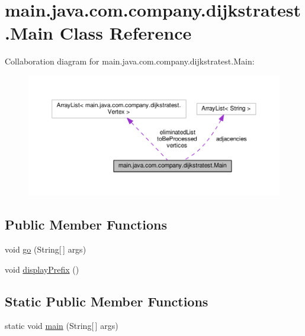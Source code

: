 \hypertarget{classmain_1_1java_1_1com_1_1company_1_1dijkstratest_1_1_main}{\section{main.\-java.\-com.\-company.\-dijkstratest.\-Main Class Reference}
\label{classmain_1_1java_1_1com_1_1company_1_1dijkstratest_1_1_main}
}


Collaboration diagram for main.\-java.\-com.\-company.\-dijkstratest.\-Main\-:
\nopagebreak
\begin{figure}[H]
\begin{center}
\leavevmode
\includegraphics[width=350pt]{classmain_1_1java_1_1com_1_1company_1_1dijkstratest_1_1_main__coll__graph}
\end{center}
\end{figure}
\subsection*{Public Member Functions}
\begin{DoxyCompactItemize}
\item 
void \hyperlink{classmain_1_1java_1_1com_1_1company_1_1dijkstratest_1_1_main_aecef650b770eeab79fb0620dee263f77}{go} (String\mbox{[}$\,$\mbox{]} args)
\item 
void \hyperlink{classmain_1_1java_1_1com_1_1company_1_1dijkstratest_1_1_main_a3e5569d3503edf65388ea1b8fad02742}{display\-Prefix} ()
\end{DoxyCompactItemize}
\subsection*{Static Public Member Functions}
\begin{DoxyCompactItemize}
\item 
static void \hyperlink{classmain_1_1java_1_1com_1_1company_1_1dijkstratest_1_1_main_a41add3527abb4fb4d0c9640aa20fba59}{main} (String\mbox{[}$\,$\mbox{]} args)
\end{DoxyCompactItemize}
